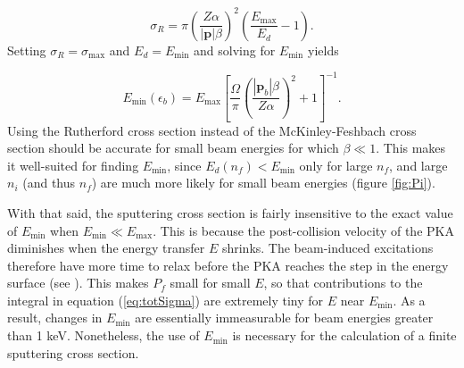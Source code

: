 \documentclass{article}
\begin{document}
\begin{equation}
  \sigma_R
  =
  \pi\left(\frac{Z\alpha}{|\mathbf{p}|\beta}\right)^2
  \left(\frac{E_\text{max}}{E_d} - 1\right).
  \label{eq:Rutherford}
\end{equation}
%
Setting $\sigma_R=\sigma_\text{max}$ and $E_d=E_\text{min}$ and solving for
$E_\text{min}$ yields

\begin{equation}
  E_\text{min}(\epsilon_b)
  =
  E_\text{max}
  \left[\frac{\Omega}{\pi}
    \left(\frac{|\mathbf{p}_b|\beta}{Z\alpha}\right)^2 + 1
  \right]^{-1}.
  \label{eq:Emin}
\end{equation}
%
Using the Rutherford cross section instead of the McKinley-Feshbach
cross section should be accurate for small beam energies for which $\beta\ll
1$.
This makes it well-suited for finding $E_\text{min}$, since
$E_d(n_f)<E_\text{min}$ only for large $n_f$, and large $n_i$ (and thus $n_f$)
are much more likely for small beam energies (figure \ref{fig:Pi}).

With that said, the sputtering cross section is fairly insensitive to the exact
value of $E_\text{min}$ when $E_\text{min} \ll E_\text{max}$.
This is because the post-collision velocity of the PKA diminishes when the
energy transfer $E$ shrinks.
The beam-induced excitations therefore have more time to relax before the PKA
reaches the step in the energy surface (see
\textit{}).
This makes $P_f$ small for small $E$, so that contributions to the integral in
equation (\ref{eq:totSigma}) are extremely tiny for $E$ near $E_\text{min}$.
As a result, changes in $E_\text{min}$ are essentially immeasurable for beam
energies greater than 1 keV.
Nonetheless, the use of $E_\text{min}$ is necessary for the calculation of a
finite sputtering cross section.


% 
\end{document}
